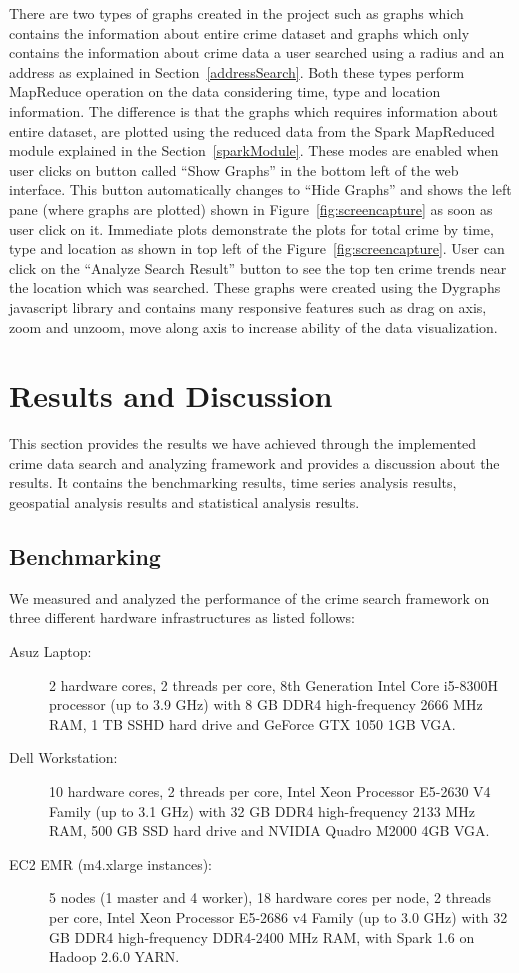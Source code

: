 There are two types of graphs created in the project such as graphs
which contains the information about entire crime dataset and graphs
which only contains the information about crime data a user searched
using a radius and an address as explained in
Section~\ref{addressSearch}. Both these types perform MapReduce
operation on the data considering time, type and location
information. The difference is that the graphs which requires
information about entire dataset, are plotted using the reduced data
from the Spark MapReduced module explained in the
Section~\ref{sparkModule}. These modes are enabled when user clicks on
button called ``Show Graphs'' in the bottom left of the web
interface. This button automatically changes to ``Hide Graphs'' and
shows the left pane (where graphs are plotted) shown in
Figure~\ref{fig:screencapture} as soon as user click on it. Immediate
plots demonstrate the plots for total crime by time, type and location
as shown in top left of the Figure~\ref{fig:screencapture}. User can
click on the ``Analyze Search Result'' button to see the top ten crime
trends near the location which was searched. These graphs were created
using the Dygraphs javascript library and contains many responsive
features such as drag on axis, zoom and unzoom, move along axis to
increase ability of the data visualization.

\section{Results and Discussion}

This section provides the results we have achieved through the
implemented crime data search and analyzing framework and provides a
discussion about the results. It contains the benchmarking results,
time series analysis results, geospatial analysis results and
statistical analysis results.

\subsection{Benchmarking}
We measured and analyzed the performance of the crime search framework
on three different hardware infrastructures as listed follows:
\begin{description}
	\item[Asuz Laptop:] 2 hardware cores, 2 threads per core, 8th
	Generation Intel Core i5-8300H processor (up to 3.9 GHz) with
	8 GB DDR4 high-frequency 2666 MHz RAM, 1 TB SSHD hard drive
	and GeForce GTX 1050 1GB VGA.
        \item[Dell Workstation:] 10
	hardware cores, 2 threads per core, Intel Xeon Processor
	E5-2630 V4 Family (up to 3.1 GHz) with 32 GB DDR4
	high-frequency 2133 MHz RAM, 500 GB SSD hard drive and NVIDIA
	Quadro M2000 4GB VGA.
        \item[EC2 EMR (m4.xlarge instances):] 5
	nodes (1 master and 4 worker), 18 hardware cores per node, 2
	threads per core, Intel Xeon Processor E5-2686 v4 Family (up
	to 3.0 GHz) with 32 GB DDR4 high-frequency DDR4-2400 MHz RAM,
	with Spark 1.6 on Hadoop 2.6.0 YARN.
\end{description}

